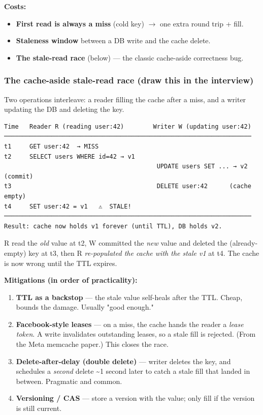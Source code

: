 \documentclass[11pt]{article}
\providecommand{\tightlist}{\setlength{\itemsep}{1pt}\setlength{\parskip}{0pt}}
\begin{document}
\textbf{Costs:}

\begin{itemize}
\tightlist
\item
  \textbf{First read is always a miss} (cold key) \(\rightarrow\) one extra round trip + fill.
\item
  \textbf{Staleness window} between a DB write and the cache delete.
\item
  \textbf{The stale-read race} (below) --- the classic cache-aside correctness bug.
\end{itemize}

\subsubsection{The cache-aside stale-read race (draw this in the interview)}\label{the-cache-aside-stale-read-race-draw-this-in-the-interview}

Two operations interleave: a reader filling the cache after a miss, and a writer updating the DB and deleting the key.

\setcodelang{}

\begin{verbatim}
Time   Reader R (reading user:42)        Writer W (updating user:42)
────────────────────────────────────────────────────────────────────
t1     GET user:42  → MISS
t2     SELECT users WHERE id=42 → v1
                                          UPDATE users SET ... → v2 (commit)
t3                                        DELETE user:42      (cache empty)
t4     SET user:42 = v1   ⚠️  STALE!
────────────────────────────────────────────────────────────────────
Result: cache now holds v1 forever (until TTL), DB holds v2.
\end{verbatim}

R read the \emph{old} value at t2, W committed the \emph{new} value and deleted the (already-empty) key at t3, then R \emph{re-populated the cache with the stale v1} at t4. The cache is now wrong until the TTL expires.

\textbf{Mitigations (in order of practicality):}

\begin{enumerate}
\def\labelenumi{\arabic{enumi}.}
\tightlist
\item
  \textbf{TTL as a backstop} --- the stale value self-heals after the TTL. Cheap, bounds the damage. Usually "good enough."
\item
  \textbf{Facebook-style leases} --- on a miss, the cache hands the reader a \emph{lease token}. A write invalidates outstanding leases, so a stale fill is rejected. (From the Meta memcache paper.) This closes the race.
\item
  \textbf{Delete-after-delay (double delete)} --- writer deletes the key, and schedules a \emph{second} delete \textasciitilde1 second later to catch a stale fill that landed in between. Pragmatic and common.
\item
  \textbf{Versioning / CAS} --- store a version with the value; only fill if the version is still current.
\end{enumerate}
\end{document}
